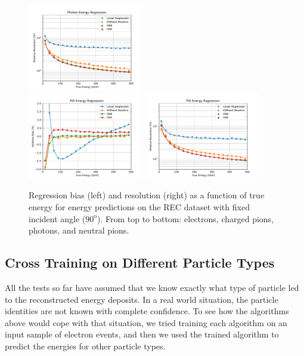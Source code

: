 \begin{figure}[htbp]
\includegraphics[width=0.45\textwidth]{Images/Calo/res_vs_E_GammaFixed_nn_vs_cnn_fits.pdf} \\
\includegraphics[width=0.45\textwidth]{Images/Calo/bias_vs_E_Pi0Fixed_nn_vs_cnn_zoom.pdf}
\includegraphics[width=0.45\textwidth]{Images/Calo/res_vs_E_Pi0Fixed_nn_vs_cnn_fits.pdf}
\caption{Regression bias (left) and resolution (right) as a function of true energy for energy predictions on the REC dataset with fixed incident angle ($90^\mathrm{o}$). From top to bottom: electrons, charged pions, photons, and neutral pions.\label{fig:reg_dnn_vs_cnn_fixed}}
\end{figure}

\subsection*{Cross Training on Different Particle Types}

All the tests so far have assumed that we know exactly what type of particle led to the reconstructed energy deposits.  In a real world situation, the particle identities are not known with complete confidence.  To see how the algorithms above would cope with that situation, we tried training each algorithm on an input sample of electron events, and then we used the trained algorithm to predict the energies for other particle types.

